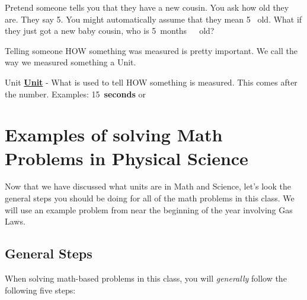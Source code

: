 \documentclass[../../main.tex]{subfiles}
\begin{document}
Pretend someone tells you that they have a new cousin.  You ask how old they are.  They say 5.  You might automatically assume that they mean \num{5}~\unit{\years} old.  What if they just got a new baby cousin, who is \qty{5}{months\ old}?

Telling someone HOW something was measured is pretty important.  We call the way we measured something a Unit.

\begin{displayquote}
	\begin{boxBox}{Unit}
	\textcolor{dracRed}{{\large\textbf{\underline{Unit}}}} - What is used to tell HOW something is measured.  This comes after the number. Examples: \qty{15}{\textbf{seconds}} or
	\end{boxBox}
\end{displayquote}

\section{Examples of solving Math Problems in Physical Science}

Now that we have discussed what units are in Math and Science, let's look the general steps you should be doing for all of the math problems in this class.  We will use an example problem from near the beginning of the year involving Gas Laws.


\subsection{General Steps}
When solving math-based problems in this class, you will \emph{generally} follow the following five steps:
\end{document}
